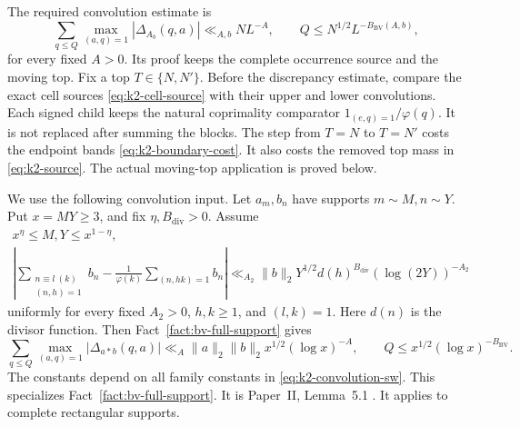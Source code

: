 The required convolution estimate is
\begin{equation}\label{eq:k2-bv-source}
 \sum_{q\le Q}\max_{(a,q)=1}|\Delta_{A_b}(q,a)|
 \ll_{A,b}NL^{-A},\qquad
 Q\le N^{1/2}L^{-B_{\mathrm{BV}}(A,b)},
\end{equation}
for every fixed \(A>0\).
Its proof keeps the complete occurrence source and the moving top.
Fix a top \(T\in\{N,N'\}\). Before the discrepancy estimate, compare the
exact cell sources \eqref{eq:k2-cell-source} with their upper and lower
convolutions. Each signed child keeps the natural
coprimality comparator \(1_{(e,q)=1}/\varphi(q)\). It is not replaced
after summing the blocks. The step from
\(T=N\) to \(T=N'\) costs the endpoint bands
\eqref{eq:k2-boundary-cost}. It also costs the removed top mass in
\eqref{eq:k2-source}. The actual moving-top application is proved below.

We use the following convolution input.
Let \(a_m,b_n\) have supports \(m\sim M,n\sim Y\).
Put \(x=MY\ge3\), and fix \(\eta,B_{\mathrm{div}}>0\).
Assume
\begin{equation}\label{eq:k2-convolution-sw}
\begin{gathered}
 x^\eta\le M,Y\le x^{1-\eta},\\
 \left|\sum_{\substack{n\equiv l\ (k)\\(n,h)=1}}b_n
 -\frac1{\varphi(k)}\sum_{(n,hk)=1}b_n\right|
 \ll_{A_2}\|b\|_2Y^{1/2}d(h)^{B_{\mathrm{div}}}
                       (\log(2Y))^{-A_2}
\end{gathered}
\end{equation}
uniformly for every fixed \(A_2>0\), \(h,k\ge1\),
and \((l,k)=1\).
Here \(d(n)\) is the divisor function.
Then Fact~\ref{fact:bv-full-support} gives
\begin{equation}\label{eq:k2-convolution}
 \sum_{q\le Q}\max_{(a,q)=1}|\Delta_{a*b}(q,a)|
 \ll_A\|a\|_2\|b\|_2x^{1/2}(\log x)^{-A},
 \qquad Q\le x^{1/2}(\log x)^{-B_{\mathrm{BV}}}.
\end{equation}
The constants depend on all family constants in
\eqref{eq:k2-convolution-sw}.
This specializes Fact~\ref{fact:bv-full-support}. It is
Paper~II, Lemma~5.1 \cite[(5.23)--(5.28)]{PaperII}.
It applies to complete rectangular supports.

